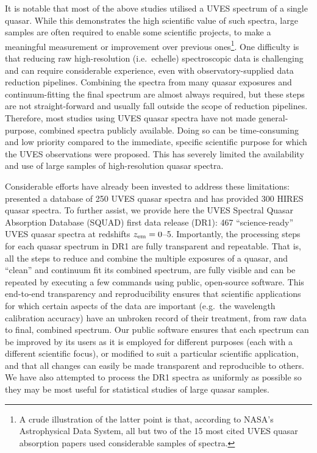 \documentclass[fleqn,usenatbib,usedcolumn]{mnras}
\newcommand{\zem}{\ensuremath{z_\textrm{\scriptsize em}}}
\begin{document}
It is notable that most of the above studies utilised a UVES spectrum of a single quasar. While this demonstrates the high scientific value of such spectra, large samples are often required to enable some scientific projects, to make a meaningful measurement or improvement over previous ones\footnote{A crude illustration of the latter point is that, according to NASA's Astrophysical Data System, all but two of the 15 most cited UVES quasar absorption papers used considerable samples of spectra.}. One difficulty is that reducing raw high-resolution (i.e.\ echelle) spectroscopic data is challenging and can require considerable experience, even with observatory-supplied data reduction pipelines. Combining the spectra from many quasar exposures and continuum-fitting the final spectrum are almost always required, but these steps are not straight-forward and usually fall outside the scope of reduction pipelines. Therefore, most studies using UVES quasar spectra have not made general-purpose, combined spectra publicly available. Doing so can be time-consuming and low priority compared to the immediate, specific scientific purpose for which the UVES observations were proposed. This has severely limited the availability and use of large samples of high-resolution quasar spectra.

Considerable efforts have already been invested to address these limitations: \citet{Zafar:2013:A140} presented a database of 250 UVES quasar spectra and \citet{OMeara:2015:111,OMeara:2017:114} has provided 300 HIRES quasar spectra. To further assist, we provide here the UVES Spectral Quasar Absorption Database (SQUAD) first data release (DR1): 467 ``science-ready'' UVES quasar spectra at redshifts $\zem=0$--5. Importantly, the processing steps for each quasar spectrum in DR1 are fully transparent and repeatable. That is, all the steps to reduce and combine the multiple exposures of a quasar, and ``clean'' and continuum fit its combined spectrum, are fully visible and can be repeated by executing a few commands using public, open-source software. This end-to-end transparency and reproducibility ensures that scientific applications for which certain aspects of the data are important (e.g.\ the wavelength calibration accuracy) have an unbroken record of their treatment, from raw data to final, combined spectrum. Our public software ensures that each spectrum can be improved by its users as it is employed for different purposes (each with a different scientific focus), or modified to suit a particular scientific application, and that all changes can easily be made transparent and reproducible to others. We have also attempted to process the DR1 spectra as uniformly as possible so they may be most useful for statistical studies of large quasar samples.
\end{document}
